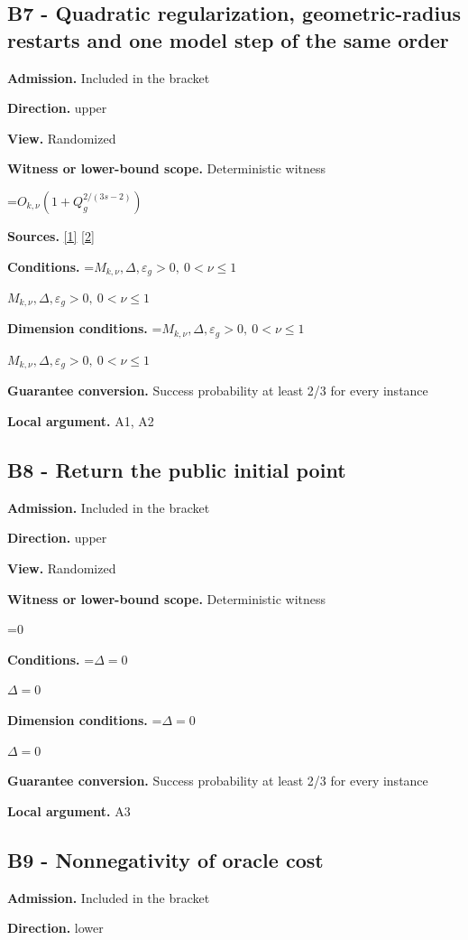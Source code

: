 \documentclass[10pt,a4paper]{article}
\newcommand{\AtlasMath}[1]{\par\begingroup\centering\setbox0=\hbox{$\displaystyle #1$}\ifdim\wd0>1.4\linewidth\typeout{ATLAS WIDE FORMULA: \the\wd0}\fi\ifdim\wd0>\linewidth\resizebox{\linewidth}{!}{\box0}\else\box0\fi\par\endgroup}
\newcommand{\AtlasInlineMath}[1]{\begingroup\setbox0=\hbox{$#1$}\ifdim\wd0>.4\linewidth\endgroup\AtlasMath{#1}\else\endgroup$#1$\fi}
\begin{document}
\subsection{B7 - Quadratic regularization, geometric-radius restarts and one model step of the same order}
\textbf{Admission.} Included in the bracket

\textbf{Direction.} upper

\textbf{View.} Randomized

\textbf{Witness or lower-bound scope.} Deterministic witness

\AtlasMath{O_{k,\nu}(1+Q_g^{2/(3s-2)})}
\textbf{Sources.} \href{https://arxiv.org/pdf/2411.08987v2}{[1]} \href{https://arxiv.org/pdf/2205.09647v1}{[2]}

\textbf{Conditions.} \AtlasInlineMath{M_{k,\nu},\Delta,\varepsilon_g>0,\ 0<\nu\le1}

\textbf{Dimension conditions.} \AtlasInlineMath{M_{k,\nu},\Delta,\varepsilon_g>0,\ 0<\nu\le1}

\textbf{Guarantee conversion.} Success probability at least 2/3 for every instance

\textbf{Local argument.} A1, A2

\subsection{B8 - Return the public initial point}
\textbf{Admission.} Included in the bracket

\textbf{Direction.} upper

\textbf{View.} Randomized

\textbf{Witness or lower-bound scope.} Deterministic witness

\AtlasMath{0}
\textbf{Conditions.} \AtlasInlineMath{\Delta=0}

\textbf{Dimension conditions.} \AtlasInlineMath{\Delta=0}

\textbf{Guarantee conversion.} Success probability at least 2/3 for every instance

\textbf{Local argument.} A3

\subsection{B9 - Nonnegativity of oracle cost}
\textbf{Admission.} Included in the bracket

\textbf{Direction.} lower
\end{document}
